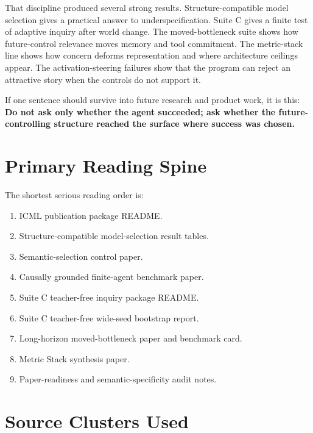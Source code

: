 \documentclass[11pt]{article}
\begin{document}
That discipline produced several strong results. Structure-compatible model
selection gives a practical answer to underspecification. Suite C gives a
finite test of adaptive inquiry after world change. The moved-bottleneck suite
shows how future-control relevance moves memory and tool commitment. The
metric-stack line shows how concern deforms representation and where
architecture ceilings appear. The activation-steering failures show that the
program can reject an attractive story when the controls do not support it.

If one sentence should survive into future research and product work, it is
this: \textbf{Do not ask only whether the agent succeeded; ask whether the
future-controlling structure reached the surface where success was chosen.}

\appendix

\section{Primary Reading Spine}

The shortest serious reading order is:

\begin{enumerate}
  \item ICML publication package README.
  \item Structure-compatible model-selection result tables.
  \item Semantic-selection control paper.
  \item Causally grounded finite-agent benchmark paper.
  \item Suite C teacher-free inquiry package README.
  \item Suite C teacher-free wide-seed bootstrap report.
  \item Long-horizon moved-bottleneck paper and benchmark card.
  \item Metric Stack synthesis paper.
  \item Paper-readiness and semantic-specificity audit notes.
\end{enumerate}

\section{Source Clusters Used}
\end{document}
